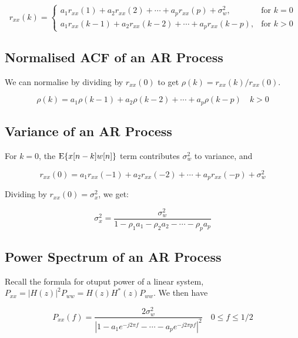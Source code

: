 \begin{equation}
    r_{xx}(k) = 
    \begin{cases}
        a_1r_{xx}(1) + a_2r_{xx}(2) + \cdots + a_pr_{xx}(p) + \sigma_w^2, & \text{for } k = 0 \\
        a_1r_{xx}(k-1) + a_2r_{xx}(k-2) + \cdots + a_pr_{xx}(k-p), & \text{for } k > 0
    \end{cases}
\end{equation}


\subsection{Normalised ACF of an AR Process}

We can normalise by dividing by $r_{xx}(0)$ to get $\rho(k) = r_{xx}(k)/r_{xx}(0)$.

\begin{equation}\label{eq:AR_norm_ACF}
    \rho(k)=a_1\rho(k-1)+a_2\rho(k-2)+\cdots+a_p\rho(k-p)\quad k>0
\end{equation}

\subsection{Variance of an AR Process}

For $k=0$, the $\text{E}\{x[n-k]w[n]\}$ term contributes $\sigma^2_w$ to variance, and 

\begin{equation}
    r_{xx}(0)=a_1r_{xx}(-1)+a_2r_{xx}(-2)+\cdots+a_pr_{xx}(-p)+\sigma_w^2
\end{equation}

Dividing by $r_{xx}(0) = \sigma^2_x$, we get:

\begin{equation}
    \sigma_x^2=\frac{\sigma_w^2}{1-\rho_1a_1-\rho_2a_2-\cdots-\rho_pa_p}
\end{equation}

\subsection{Power Spectrum of an AR Process}

Recall the formula for otuput power of a linear system, $P_{xx}=|H(z)|^2P_{ww}=H(z)H^*(z)P_{ww}$. We then have 

\begin{equation}
    P_{xx}(f)=\frac{2\sigma_w^2}{\left|1-a_1e^{-j2\pi f}-\cdots-a_pe^{-j2\pi pf}\right|^2}\quad0\leq f\leq1/2
\end{equation}


